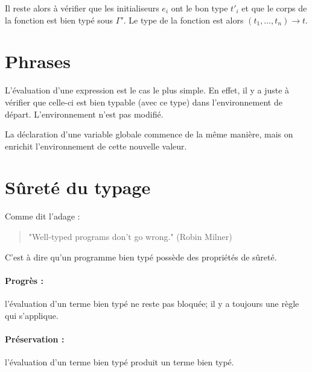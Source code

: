 Il reste alors à vérifier que les initialiseurs $e_i$ ont le bon type $t'_i$ et
que le corps de la fonction est bien typé sous $Γ'$. Le type de la fonction est
alors $(t_1, …, t_n) → t$.

\begin{mathpar}
\end{mathpar}

\section{Phrases}

L'évaluation d'une expression est le cas le plus simple. En effet, il y a juste
à vérifier que celle-ci est bien typable (avec ce type) dans l'environnement de
départ. L'environnement n'est pas modifié.

\begin{mathpar}
\end{mathpar}

La déclaration d'une variable globale commence de la même manière, mais on
enrichit l'environnement de cette nouvelle valeur.

\begin{mathpar}
\end{mathpar}

\begin{mathpar}
\end{mathpar}


\section{Sûreté du typage}

Comme dit l'adage :

\begin{quote}
"Well-typed programs don't go wrong." (Robin Milner)
\end{quote}

C'est à dire qu'un programme bien typé possède des propriétés de sûreté.

\paragraph{Progrès :} l'évaluation d'un terme bien typé ne reste pas bloquée;
il y a toujours une règle qui s'applique.

\paragraph{Préservation :} l'évaluation d'un terme bien typé produit un terme
bien typé.

